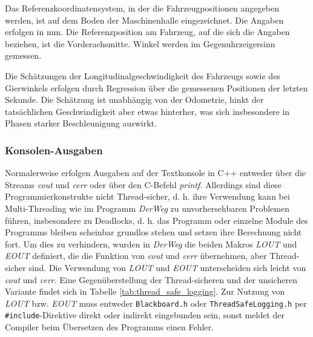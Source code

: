 \documentclass[a4paper, 11pt]{article}
\newcommand{\DerWeg}{\textit{DerWeg }}  %
\begin{document}
{Das Referenzkoordinatensystem, in der die Fahrzeugpositionen angegeben werden, ist auf dem Boden der Maschinenhalle eingezeichnet. Die Angaben erfolgen in mm. Die Referenzposition am Fahrzeug, auf die sich die Angaben beziehen, ist die Vorderachsmitte. Winkel werden im Gegenuhrzeigersinn gemessen.

Die Schätzungen der Longitudinalgeschwindigkeit des Fahrzeugs sowie des Gierwinkels erfolgen durch Regression über die gemessenen Positionen der letzten Sekunde. Die Schätzung ist unabhängig von der Odometrie, hinkt der tatsächlichen Geschwindigkeit aber etwas hinterher, was sich insbesondere in Phasen starker Beschleunigung auswirkt.

\subsubsection{Konsolen-Ausgaben}

Normalerweise erfolgen Ausgaben auf der Textkonsole in C++ entweder über die Streams \textit{cout} und \textit{cerr} oder über den C-Befehl \textit{printf}. Allerdings sind diese Programmierkonstrukte nicht Thread-sicher, d. h. ihre Verwendung kann bei Multi-Threading wie im Programm \DerWeg zu unvorhersehbaren Problemen führen, insbesondere zu Deadlocks, d. h. das Programm oder einzelne Module des Programms bleiben scheinbar grundlos stehen und setzen ihre Berechnung nicht fort. Um dies zu verhindern, wurden in \DerWeg die beiden Makros \textit{LOUT} und \textit{EOUT} definiert, die die Funktion von \textit{cout} und \textit{cerr} übernehmen, aber Thread-sicher sind. Die Verwendung von \textit{LOUT} und \textit{EOUT} unterscheiden sich leicht von \textit{cout} und \textit{cerr}. Eine Gegenüberstellung der Thread-sicheren und der unsicheren Variante findet sich in Tabelle \ref{tab:thread_safe_logging}. Zur Nutzung von \textit{LOUT} bzw. \textit{EOUT} muss entweder \texttt{Blackboard.h} oder \texttt{ThreadSafeLogging.h} per \texttt{\#include}-Direktive direkt oder indirekt eingebunden sein, sonst meldet der Compiler beim Übersetzen des Programms einen Fehler.

}
\end{document}
